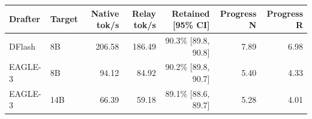 \begin{tabular}{llrrrrr}
\toprule
Drafter & Target & Native tok/s & Relay tok/s & Retained [95\% CI] & Progress N & Progress R \\
\midrule
DFlash & 8B & 206.58 & 186.49 & 90.3\% [89.8, 90.8] & 7.89 & 6.98 \\
EAGLE-3 & 8B & 94.12 & 84.92 & 90.2\% [89.8, 90.7] & 5.40 & 4.33 \\
EAGLE-3 & 14B & 66.39 & 59.18 & 89.1\% [88.6, 89.7] & 5.28 & 4.01 \\
\bottomrule
\end{tabular}
